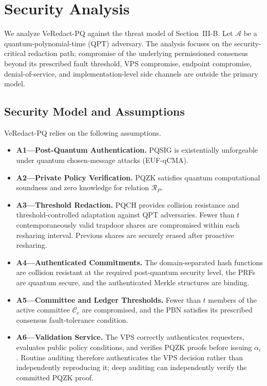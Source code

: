 \documentclass[lettersize,journal]{IEEEtran}
\begin{document}
    
    
    

\section{Security Analysis}
\label{sec:security}

We analyze VeRedact-PQ against the threat model of Section~III-B.
Let $\mathcal{A}$ be a quantum-polynomial-time (QPT) adversary.
The analysis focuses on the security-critical redaction path; compromise
of the underlying permissioned consensus beyond its prescribed fault
threshold, VPS compromise, endpoint compromise, denial-of-service, and
implementation-level side channels are outside the primary model.

\subsection{Security Model and Assumptions}

VeRedact-PQ relies on the following assumptions.

\begin{itemize}

\item \textbf{A1---Post-Quantum Authentication.}
PQSIG is existentially unforgeable under quantum chosen-message
attacks (EUF-qCMA).

\item \textbf{A2---Private Policy Verification.}
PQZK satisfies quantum computational soundness and zero knowledge for
relation $\mathcal{R}_P$.

\item \textbf{A3---Threshold Redaction.}
PQCH provides collision resistance and threshold-controlled adaptation
against QPT adversaries. Fewer than $t$ contemporaneously valid
trapdoor shares are compromised within each resharing interval.
Previous shares are securely erased after proactive resharing.

\item \textbf{A4---Authenticated Commitments.}
The domain-separated hash functions are collision resistant at the
required post-quantum security level, the PRFs are quantum secure, and
the authenticated Merkle structures are binding.

\item \textbf{A5---Committee and Ledger Thresholds.}
Fewer than $t$ members of the active committee $\mathcal{C}_e$ are
compromised, and the PBN satisfies its prescribed consensus
fault-tolerance condition.

\item \textbf{A6---Validation Service.}
The VPS correctly authenticates requesters, evaluates public policy
conditions, and verifies PQZK proofs before issuing $\alpha_i$.
Routine auditing therefore authenticates the VPS decision rather than
independently reproducing it; deep auditing can independently verify
the committed PQZK proof.

\end{itemize}
\end{document}
